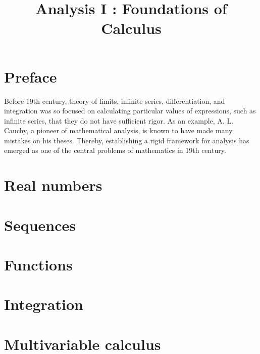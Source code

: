 \documentclass{../crs}
\title{Analysis I : Foundations of Calculus}
\begin{document}
\maketitle
\tableofcontents


\frontmatter

\chapter{Preface}

Before 19th century, theory of limits, infinite series, differentiation, and integration was so focused on calculating particular values of expressions, such as infinite series, that they do not have sufficient rigor.
As an example, A. L. Cauchy, a pioneer of mathematical analysis, is known to have made many mistakes on his theses.
Thereby, establishing a rigid framework for analysis has emerged as one of the central problems of mathematics in 19th century.%





\mainmatter

\chapter{Real numbers}


\chapter{Sequences}


\chapter{Functions}


\chapter{Integration}


\chapter{Multivariable calculus}
\end{document}
